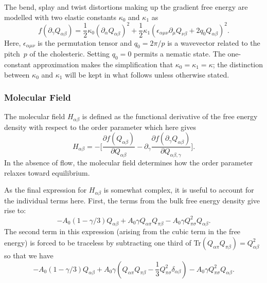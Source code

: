 The bend, splay and twist distortions making up the gradient free
energy are modelled with two elastic
constants $\kappa_0$ and $\kappa_1$ as
\begin{equation}
f(\partial_\gamma Q_{\alpha\beta}) = 
{\textstyle\frac{1}{2}} \kappa_0 (\partial_\alpha Q_{\alpha\beta})^2
+ {\textstyle\frac{1}{2}} \kappa_1
(\epsilon_{\alpha\mu\nu} \partial_\mu Q_{\nu\beta} + 2q_0 Q_{\alpha\beta})^2.
\label{equation-lc-gradient-fe}
\end{equation}
Here, $\epsilon_{\alpha\mu\nu}$ is the permutation tensor and
$q_0 = 2\pi/p$ is a wavevector related to the pitch~$p$ of the
cholesteric. Setting $q_0 = 0$ permits a nematic state.
The one-constant approximation makes the simplification that
$\kappa_0 = \kappa_1 = \kappa$; the distinction between
$\kappa_0$ and $\kappa_1$ will be kept
in what follows unless otherwise stated.


\subsubsection{Molecular Field}

The molecular field $H_{\alpha\beta}$ is defined as the functional
derivative of the
free energy density with respect to the order parameter which here
gives
\begin{equation}
H_{\alpha\beta} = -\Bigg[
  \frac{\partial f(Q_{\alpha\beta})}{\partial Q_{\alpha\beta}}
- \partial_\gamma \frac{\partial f(\partial_\gamma Q_{\alpha\beta})}
{\partial Q_{\alpha\beta,\gamma}} \Bigg].
\end{equation}
In the absence of flow, the molecular field determines how the
order parameter relaxes toward equilibrium.

As the final expression for $H_{\alpha\beta}$ is somewhat complex, it
is useful to 
account for the individual terms here. First, the terms from the bulk free
energy density give rise to:
\begin{equation}
-A_0 (1 - \gamma/3) Q_{\alpha\beta} + A_0 \gamma Q_{\alpha\pi} Q_{\pi\beta}
- A_0 \gamma Q_{\pi\sigma}^2 Q_{\alpha\beta}.
\nonumber
\end{equation}
The second term in this expression
(arising from the cubic term in the free energy) is
forced to be traceless by subtracting one third of
Tr$(Q_{\alpha\pi}Q_{\pi\beta}) = Q_{\alpha\beta}^2$
so that we have
\begin{equation}
- A_0 (1 - \gamma/3) Q_{\alpha\beta}
+ A_0 \gamma (Q_{\alpha\pi} Q_{\pi\beta}
               - {\textstyle\frac{1}{3}} Q_{\pi\sigma}^2\delta_{\alpha\beta})
- A_0 \gamma Q_{\pi\sigma}^2 Q_{\alpha\beta}.
\nonumber
\end{equation}

